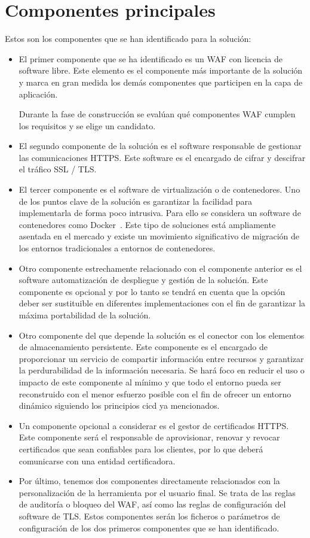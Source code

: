 \section{Componentes principales}
\par Estos son los componentes que se han identificado para la solución:
\begin{itemize}
  \item El primer componente que se ha identificado es un WAF con licencia de software libre. Este elemento es el componente más importante de la solución y
    marca en gran medida los demás componentes que participen en la capa de aplicación.
    \par Durante la fase de construcción se evalúan qué componentes WAF cumplen los requisitos y se elige un candidato.
  \item El segundo componente de la solución es el software responsable de gestionar las comunicaciones HTTPS. Este software es el encargado de cifrar y
    descifrar el tráfico SSL / TLS.
  \item El tercer componente es el software de virtualización o de contenedores. Uno de los puntos clave de la solución es garantizar la facilidad para
    implementarla de forma poco intrusiva. Para ello se considera un software de contenedores como Docker~\cite{docker}. Este tipo de soluciones está
    ampliamente asentada en el mercado y existe un movimiento significativo de migración de los entornos tradicionales a entornos de contenedores.
  \item Otro componente estrechamente relacionado con el componente anterior es el software automatización de despliegue y gestión de la solución. Este
    componente es opcional y por lo tanto se tendrá en cuenta que la opción deber ser sustituible en diferentes implementaciones con el fin de garantizar la
    máxima portabilidad de la solución.
  \item Otro componente del que depende la solución es el conector con los elementos de almacenamiento persistente. Este componente es el encargado de
    proporcionar un servicio de compartir información entre recursos y garantizar la perdurabilidad de la información necesaria. Se hará foco en reducir el uso
    o impacto de este componente al mínimo y que todo el entorno pueda ser reconstruido con el menor esfuerzo posible con el fin de ofrecer un entorno dinámico
    siguiendo los principios \acrshort{cicd} ya mencionados.
  \item Un componente opcional a considerar es el gestor de certificados HTTPS. Este componente será el responsable de aprovisionar, renovar y revocar certificados que sean confiables para los clientes, por lo que deberá
    comunicarse con una entidad certificadora.
  \item Por último, tenemos dos componentes directamente relacionados con la personalización de la herramienta por el usuario final. Se trata de las reglas de
    auditoría o bloqueo del WAF, así como las reglas de configuración del software de TLS. Estos componentes serán los ficheros o parámetros de configuración de
    los dos primeros componentes que se han identificado.
\end{itemize}

